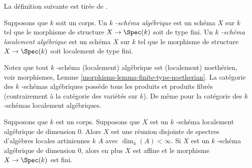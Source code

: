 \noindent
La définition suivante est tirée
de \cite[I Definition 6.4.1]{EGA}.

\begin{definition}
\label{definition-algebraic-scheme}
Supposons que $k$ soit un corps. Un {\it $k$ -schéma
algébrique } est un schéma $X$ sur $k$ tel que le morphisme de
structure $X \to \Spec(k)$ soit de type fini. Un {\it $k$ -schéma
localement algébrique } est un schéma $X$ sur $k$ tel que le
morphisme de structure $X \to \Spec(k)$ soit localement de type fini.
\end{definition}

\noindent
Notez que tout $k$ -schéma (localement) algébrique est (localement)
noethérien, voir morphismes, Lemme
\ref{morphisms-lemma-finite-type-noetherian}. La catégorie des $k$ -schémas
algébriques possède tous les produits et produits fibrés (contrairement à la catégorie
des variétés sur $k$). De même pour la catégorie des $k$ -schémas localement algébriques.

\begin{lemma}
\label{lemma-algebraic-scheme-dim-0}
Supposons que $k$ est un corps. Supposons que $X$ est un $k$ -schéma
localement algébrique de dimension $0$. Alors $X$ est une réunion
disjointe de spectres d'algèbres locales artiniennes $k$ $A$ avec
$\dim_k(A) < \infty$. Si $X$ est un $k$ -schéma algébrique de dimension
$0$, alors en plus $X$ est affine et le morphisme $X \to \Spec(k)$ est fini.
\end{lemma}


